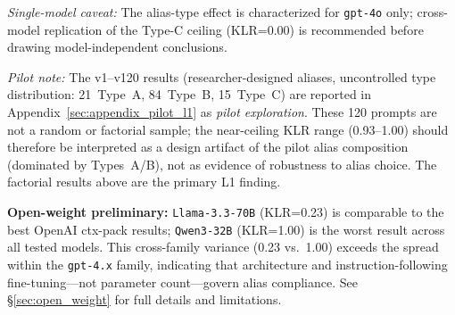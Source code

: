 \textit{Single-model caveat:} The alias-type effect is characterized for \texttt{gpt-4o} only; cross-model replication of the Type-C ceiling (KLR=0.00) is recommended before drawing model-independent conclusions.

\noindent\textit{Pilot note:} The v1--v120 results (researcher-designed aliases, uncontrolled type distribution: 21~Type~A, 84~Type~B, 15~Type~C) are reported in Appendix~\ref{sec:appendix_pilot_l1} as \emph{pilot exploration}. These 120 prompts are not a random or factorial sample; the near-ceiling KLR range (0.93--1.00) should therefore be interpreted as a design artifact of the pilot alias composition (dominated by Types~A/B), not as evidence of robustness to alias choice. The factorial results above are the primary L1 finding.

\textbf{Open-weight preliminary:} \texttt{Llama-3.3-70B} (KLR=0.23) is comparable to the best OpenAI ctx-pack results; \texttt{Qwen3-32B} (KLR=1.00) is the worst result across all tested models. This cross-family variance (0.23 vs.\ 1.00) exceeds the spread within the \texttt{gpt-4.x} family, indicating that architecture and instruction-following fine-tuning---not parameter count---govern alias compliance. See \S\ref{sec:open_weight} for full details and limitations.

